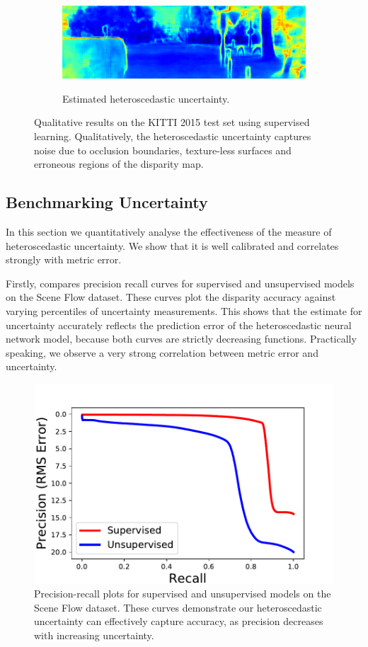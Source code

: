 \begin{figure}[p]
\begin{center}
\begin{subfigure}[t]{\linewidth}
{			\includegraphics[width=0.33\linewidth]{uncertainty/000167_10_png_uncertainty.png}}
	        \caption{Estimated heteroscedastic uncertainty.}
		\end{subfigure}
	\end{center}
	\caption[Qualitative results on the KITTI 2015 test set using supervised learning.]{Qualitative results on the KITTI 2015 test set using supervised learning. Qualitatively, the heteroscedastic uncertainty captures noise due to occlusion boundaries, texture-less surfaces and erroneous regions of the disparity map.}
	\label{fig:results_qualitative_kitti}
\end{figure}

\subsection{Benchmarking Uncertainty}

In this section we quantitatively analyse the effectiveness of the measure of heteroscedastic uncertainty. We show that it is well calibrated and correlates strongly with metric error.

Firstly,  compares precision recall curves for supervised and unsupervised models on the Scene Flow dataset. These curves plot the disparity accuracy against varying percentiles of uncertainty measurements. This shows that the estimate for uncertainty accurately reflects the prediction error of the heteroscedastic neural network model, because both curves are strictly decreasing functions. Practically speaking, we observe a very strong correlation between metric error and uncertainty.

\begin{figure}[h]
\centering
\includegraphics[width=0.5\linewidth,trim={0 0 0 3em},clip]{uncertainty/regression_precision_recall}
\caption[Precision-recall plots.]{Precision-recall plots for supervised and unsupervised models on the Scene Flow dataset. These curves demonstrate our heteroscedastic uncertainty can effectively capture accuracy, as precision decreases with increasing uncertainty.}
\label{fig:precision_recall}
\end{figure}

